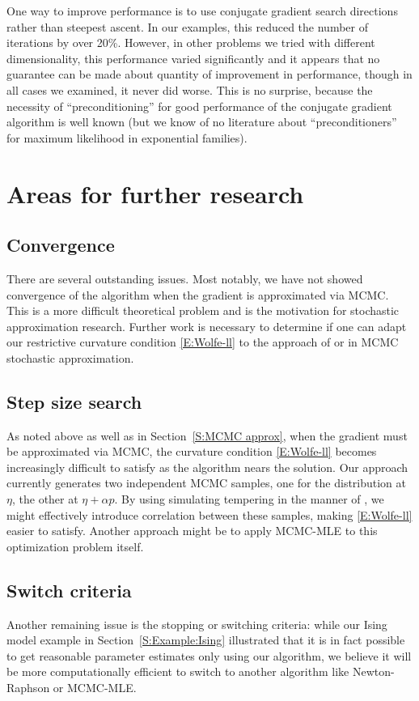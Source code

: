 One way to improve performance is to use conjugate gradient search directions rather 
than steepest ascent.  In our 
examples, this reduced the number of iterations by over 20\%.  However, in other 
problems we tried with different 
dimensionality, this performance varied significantly and it appears that no guarantee 
can be made about quantity of 
improvement in performance, though in all cases we examined, it never did worse.  This 
is no surprise, because the
necessity of ``preconditioning'' for good performance of the conjugate gradient 
algorithm is well known (but 
we know of no literature about ``preconditioners'' for 
maximum likelihood in exponential families).

\section{Areas for further research}
\subsection{Convergence}
There are several outstanding issues.  Most notably, we have not showed convergence of 
the algorithm when the gradient 
is approximated via MCMC.  This is a more difficult theoretical problem and is the 
motivation for stochastic 
approximation research.  
Further work is necessary to determine if one can adapt our restrictive curvature 
condition \eqref{E:Wolfe-ll} to the 
approach of \citet{Andrieu:2005} or \citet{Liang:2010} in MCMC stochastic 
approximation.  

\subsection{Step size search}
As noted above as well as in Section~\ref{S:MCMC approx}, when the gradient must be approximated
via MCMC, the curvature condition 
\eqref{E:Wolfe-ll} becomes increasingly difficult to satisfy as the algorithm nears the
solution.  Our approach currently generates two independent MCMC samples, one for
the distribution at $\eta$, the other at $\eta + \alpha p$.  By using simulating tempering
in the manner of \citep{Geyer:1995}, we might effectively introduce correlation between these
samples, making \eqref{E:Wolfe-ll} easier to satisfy.  Another approach might be to apply MCMC-MLE to this optimization problem itself.

\subsection{Switch criteria}
Another remaining issue is the stopping or switching criteria: while our Ising model example
in Section~\ref{S:Example:Ising} illustrated that it is in fact possible to get reasonable 
parameter estimates only using our algorithm, we believe it will be more computationally
efficient to switch to another algorithm like Newton-Raphson or MCMC-MLE.  

